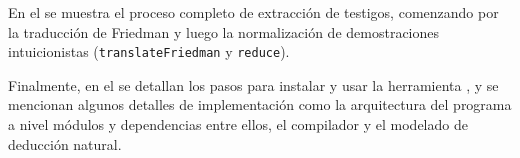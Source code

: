 En el  se muestra el proceso completo de extracción de testigos, comenzando por la traducción de Friedman y luego la normalización de demostraciones intuicionistas (\texttt{translateFriedman} y \texttt{reduce}).

Finalmente, en el  se detallan los pasos para instalar y usar la herramienta \ppaTool{}, y se mencionan algunos detalles de implementación como la arquitectura del programa a nivel módulos y dependencias entre ellos, el compilador y el modelado de deducción natural.